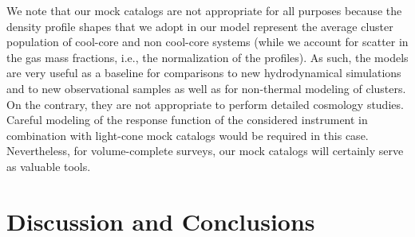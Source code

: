 \documentclass[useAMS,usenatbib]{mn2e}
\begin{document}
{We note that our mock catalogs are not appropriate for all purposes because the
density profile shapes that we adopt in our model represent the average cluster
population of cool-core and non cool-core systems (while we account for scatter
in the gas mass fractions, i.e., the normalization of the profiles). As such,
the models are very useful as a baseline for comparisons to new hydrodynamical
simulations and to new observational samples as well as for non-thermal modeling
of clusters. On the contrary, they are not appropriate to perform detailed
cosmology studies. Careful modeling of the response function of the considered
instrument in combination with light-cone mock catalogs would be required in
this case. Nevertheless, for volume-complete surveys, our mock catalogs will
certainly serve as valuable tools.  }


\section{Discussion and Conclusions}
\label{sec:7}
\end{document}
